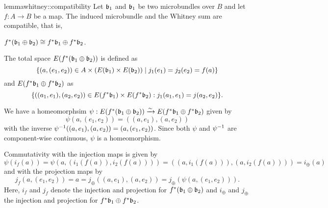 \begin{scope} \newcommand{\wleft}{\ind{f} (\whitney{\bb_1}{\bb_2})} \newcommand{\wright}{\whitney{\ind{f}\bb_1}{\ind{f}\bb_2}}

\begin{mystatement}{lemma}{whitney::compatibility} Let $\bb_1$ and $\bb_1$ be two microbundles over $B$ and let $f: A \to B$ be a map. The induced microbundle and the Whitney sum are compatible, that is, \begin{center} $\wleft \cong \wright$. \end{center} \end{mystatement}

\begin{myproof} The total space $E(\wleft)$ is defined as \[ \{(a, (e_1, e_2)) \in A \cross (E(\bb_1) \cross E(\bb_2)) \mid j_1(e_1) = j_2(e_2) = f(a) \} \] and $E(\wright)$ as \[ \set{((a_1, e_1), (a_2, e_2)) \in E(\ind{f}\bb_1) \cross E(\ind{f}\bb_2)}{j_1(a_1, e_1) = j(a_2, e_2)}. \]

We have a homeomorphsim $\psi: E(\wleft) \isomto E(\wright)$ given by \[ \psi(a, (e_1, e_2)) = ((a, e_1), (a, e_2)) \] with the inverse $\psi^{-1}((a, e_1), (a, e_2)) = (a, (e_1, e_2))$. Since both $\psi$ and $\psi^{-1}$ are component-wise continuous, $\psi$ is a homeomorphism.

Commutativity with the injection maps is given by \[ \psi(i_f(a)) = \psi(a, (i_1(f(a)), i_2(f(a)))) = ((a, i_1(f(a))), (a, i_2(f(a)))) = i_\oplus(a) \] and with the projection maps by \[ j_f(a, (e_1, e_2)) = a = j_\oplus((a, e_1), (a, e_2)) = j_\oplus(\psi(a, (e_1, e_2))). \] Here, $i_f$ and $j_f$ denote the injection and projection for $\wleft$ and $i_\oplus$ and $j_\oplus$ the injection and projection for $\wright$. \end{myproof} \end{scope}